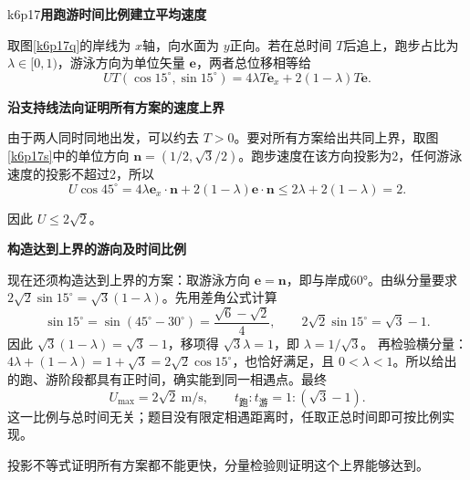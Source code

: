 \begin{drillsolution}{k6p17}\textbf{用跑游时间比例建立平均速度}\par\nobreak
取图\ref{k6p17q}的岸线为 $x$轴，向水面为 $y$正向。若在总时间 $T$后追上，跑步占比为 $\lambda\in[0,1)$，游泳方向为单位矢量 $\bm e$，两者总位移相等给
\[UT(\cos15^\circ,\sin15^\circ)=4\lambda T\bm e_x+2(1-\lambda)T\bm e.
\]


\par\medskip{}\noindent\textbf{沿支持线法向证明所有方案的速度上界}\par\nobreak
由于两人同时同地出发，可以约去 $T>0$。要对所有方案给出共同上界，取图\ref{k6p17s}中的单位方向 $\bm n=(1/2,\sqrt3/2)$。跑步速度在该方向投影为2，任何游泳速度的投影不超过2，所以
\[U\cos45^\circ
=4\lambda\bm e_x\cdot\bm n+2(1-\lambda)\bm e\cdot\bm n
\le2\lambda+2(1-\lambda)=2.
\]

因此 $U\le2\sqrt2$。



\par\medskip{}\noindent\textbf{构造达到上界的游向及时间比例}\par\nobreak
现在还须构造达到上界的方案：取游泳方向 $\bm e=\bm n$，即与岸成60°。由纵分量要求 $2\sqrt2\sin15^\circ=\sqrt3(1-\lambda)$。先用差角公式计算
\[
 \sin15^\circ=\sin(45^\circ-30^\circ)
 =\frac{\sqrt6-\sqrt2}{4},\qquad
 2\sqrt2\sin15^\circ=\sqrt3-1.
\]
因此 $\sqrt3(1-\lambda)=\sqrt3-1$，移项得 $\sqrt3\lambda=1$，即 $\lambda=1/\sqrt3$。
再检验横分量：$4\lambda+(1-\lambda)=1+\sqrt3=2\sqrt2\cos15^\circ$，也恰好满足，且 $0<\lambda<1$。所以给出的跑、游阶段都具有正时间，确实能到同一相遇点。最终
\[\boxed{U_{\max}=2\sqrt2\ \mathrm{m/s}},\qquad
\boxed{t_{\text{跑}}:t_{\text{游}}=1:(\sqrt3-1)}.
\]
这一比例与总时间无关；题目没有限定相遇距离时，任取正总时间即可按比例实现。

投影不等式证明所有方案都不能更快，分量检验则证明这个上界能够达到。\end{drillsolution}


